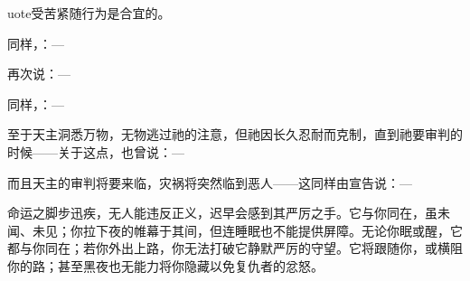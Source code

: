 uote{受苦紧随行为是合宜的。}\par

同样，：—\par

\par

再次说：—\par

\par

同样，：—\par

\par

至于天主洞悉万物，无物逃过祂的注意，但祂因长久忍耐而克制，直到祂要审判的时候——关于这点，也曾说：—\par

\par

而且天主的审判将要来临，灾祸将突然临到恶人——这同样由宣告说：—\par

命运之脚步迅疾，\newline{}无人能违反正义，\newline{}迟早会感到其严厉之手。\newline{}它与你同在，虽未闻、未见；\newline{}你拉下夜的帷幕于其间，\newline{}但连睡眠也不能提供屏障。\newline{}无论你眠或醒，它都与你同在；\newline{}若你外出上路，\newline{}你无法打破它静默严厉的守望。\newline{}它将跟随你，或横阻你的路；\newline{}甚至黑夜也无能力\newline{}将你隐藏以免复仇者的忿怒。\newline{}\par

